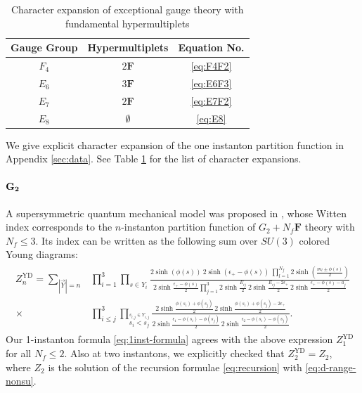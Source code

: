\documentclass[letterpaper, 11pt]{article}
\def\e{\epsilon}
\begin{document}
{\begin{table}[h!]
\centering
  \begin{tabular}{cc|c}
    \hline
    Gauge Group & Hypermultiplets & Equation No.\\
    \hline\hline
	$F_4$ & $2\mathbf{F}$ & \eqref{eq:F4F2}\\
	$E_6$ & $3\mathbf{F}$ & \eqref{eq:E6F3}\\
	$E_7$ & $2\mathbf{F}$ & \eqref{eq:E7F2}\\
	$E_8$ & $\emptyset$ &  \eqref{eq:E8}\\\hline
    \end{tabular}
  \caption{Character expansion of exceptional gauge theory with fundamental hypermultiplets}
  \label{tbl:exc-data}
\end{table}

We give explicit character expansion of the one instanton partition function in Appendix \ref{sec:data}. See Table \ref{tbl:exc-data} for the list of character expansions. 

\paragraph{$\bf G_2$}
A supersymmetric quantum mechanical model was proposed in  \cite{Kim:2018gjo}, whose Witten index corresponds to the $n$-instanton partition function of 
$G_2 + N_f \mathbf{F}$ theory with $N_f \leq 3$. Its index can be written as the following sum over $SU(3)$ colored Young diagrams:
\begin{align}
\begin{split}
  Z_n^\text{YD} = \sum_{|\vec{Y}| = n} &\prod_{i=1}^3\prod_{s \in Y_i}\frac{2\sinh{(\phi(s))} \ 2\sinh{(\e_+-\phi(s))} \ \prod_{l=1}^{N_f}2\sinh(\frac{m_l \pm \phi(s)}{2}) }{2\sinh{\frac{\e_+ - \phi(s)}{2}}\prod_{j=1}^3 2\sinh{\frac{E_{ij}}{2}}\,2\sinh{\frac{E_{ij}-2\e_+}{2}}\,2\sinh{\frac{\e_+ - \phi(s) - a_j}{2}}} \\ \times &\prod_{i \leq j}^3 \prod_{\stackrel{s_{i,j} \in Y_{i,j}}{s_i < s_j}} \frac{2\sinh{\frac{\phi(s_i)+\phi(s_j)}{2}}\, 2\sinh{\frac{\phi(s_i)+\phi(s_j)-2\e_+}{2}}}{ 2\sinh{\frac{\e_1 - \phi(s_i)-\phi(s_j)}{2}} \, 2\sinh{\frac{\e_2 - \phi(s_i)-\phi(s_j)}{2}}}.
\end{split}
\end{align}
Our 1-instanton formula \eqref{eq:1inst-formula} agrees with the above expression $Z_1^\text{YD}$ for all $N_f \leq 2$. Also at two instantons, we explicitly checked that $Z_2^\text{YD} = Z_2$, where $Z_2$ is the solution of the recursion formulae \eqref{eq:recursion} with \eqref{eq:d-range-nonsu}.


}
\end{document}
